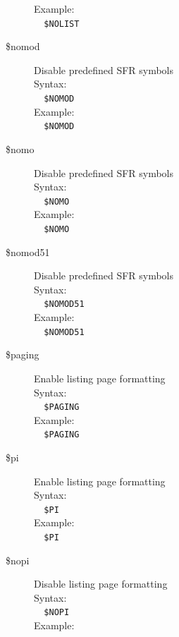 \documentclass[a4paper,twoside,12pt]{book}
\begin{document}
\begin{description}
				Example:\\
				\verb'  '{\color{highlight_control}\verb'$NOLIST'}\\
			\item[\$nomod] Disable predefined SFR symbols\\
				Syntax:\\
				\verb'  '{\color{highlight_control}\verb'$NOMOD'}\\
				Example:\\
				\verb'  '{\color{highlight_control}\verb'$NOMOD'}\\
			\item[\$nomo] Disable predefined SFR symbols\\
				Syntax:\\
				\verb'  '{\color{highlight_control}\verb'$NOMO'}\\
				Example:\\
				\verb'  '{\color{highlight_control}\verb'$NOMO'}\\
			\item[\$nomod51] Disable predefined SFR symbols\\
				Syntax:\\
				\verb'  '{\color{highlight_control}\verb'$NOMOD51'}\\
				Example:\\
				\verb'  '{\color{highlight_control}\verb'$NOMOD51'}\\
			\item[\$paging] Enable listing page formatting\\
				Syntax:\\
				\verb'  '{\color{highlight_control}\verb'$PAGING'}\\
				Example:\\
				\verb'  '{\color{highlight_control}\verb'$PAGING'}\\
			\item[\$pi] Enable listing page formatting\\
				Syntax:\\
				\verb'  '{\color{highlight_control}\verb'$PI'}\\
				Example:\\
				\verb'  '{\color{highlight_control}\verb'$PI'}\\
			\item[\$nopi] Disable listing page formatting\\
				Syntax:\\
				\verb'  '{\color{highlight_control}\verb'$NOPI'}\\
				Example:\\

\end{description}
\end{document}
